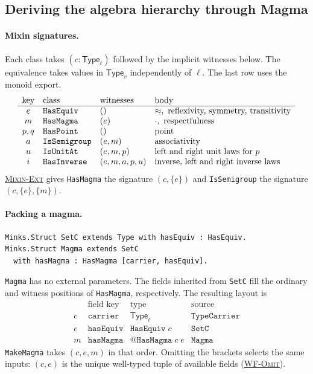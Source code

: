 \documentclass{article}
\newcommand{\ttt}[1]{\texttt{#1}}
\newcommand{\ruse}[1]{\hyperlink{rule-#1}{\textsc{#1}}}
\begin{document}
\subsection{Deriving the algebra hierarchy through Magma}
\label{ex:magma}
\paragraph{Mixin signatures.}
Each class takes $(c:\mathsf{Type}_{\ell})$ followed by the implicit
witnesses below. The equivalence takes values in $\mathsf{Type}_v$
independently of $\ell$. The last row uses the monoid export.
\[
\begin{array}{c@{\quad}ll@{\quad}l}
 \text{key}&\text{class}&\text{witnesses}&\text{body}\\ \hline
 e&\ttt{HasEquiv}&()&{\approx},\ \text{reflexivity, symmetry, transitivity}\\
 m&\ttt{HasMagma}&(e)&{\cdot},\ \text{respectfulness}\\
 p,q&\ttt{HasPoint}&()&\text{point}\\
 a&\ttt{IsSemigroup}&(e,m)&\text{associativity}\\
 u&\ttt{IsUnitAt}&(e,m,p)&\text{left and right unit laws for }p\\
 i&\ttt{HasInverse}&(e,m,a,p,u)&\text{inverse, left and right inverse laws}
\end{array}
\]
\ruse{Mixin-Ext} gives \ttt{HasMagma} the signature $(c,\{e\})$ and
\ttt{IsSemigroup} the signature $(c,\{e\},\{m\})$.

\paragraph{Packing a magma.}
\begin{verbatim}
Minks.Struct SetC extends Type with hasEquiv : HasEquiv.
Minks.Struct Magma extends SetC
  with hasMagma : HasMagma [carrier, hasEquiv].
\end{verbatim}
\ttt{Magma} has no external parameters. The fields inherited from
\ttt{SetC} fill the ordinary and witness positions of \ttt{HasMagma},
respectively. The resulting layout is
\[
\begin{array}{llll}
 &\text{field key}&\text{type}&\text{source}\\ \hline
 c&\ttt{carrier} &\mathsf{Type}_{\ell}&\ttt{TypeCarrier}\\
 e&\ttt{hasEquiv}&\ttt{HasEquiv}\;c&\ttt{SetC}\\
 m&\ttt{hasMagma}&\ttt{@HasMagma}\;c\;e&\ttt{Magma}
\end{array}
\]
\ttt{MakeMagma} takes $(c,e,m)$ in that order. Omitting the brackets
selects the same inputs: $(c,e)$ is the unique well-typed tuple of
available fields (\ruse{WF-Omit}).
\end{document}
